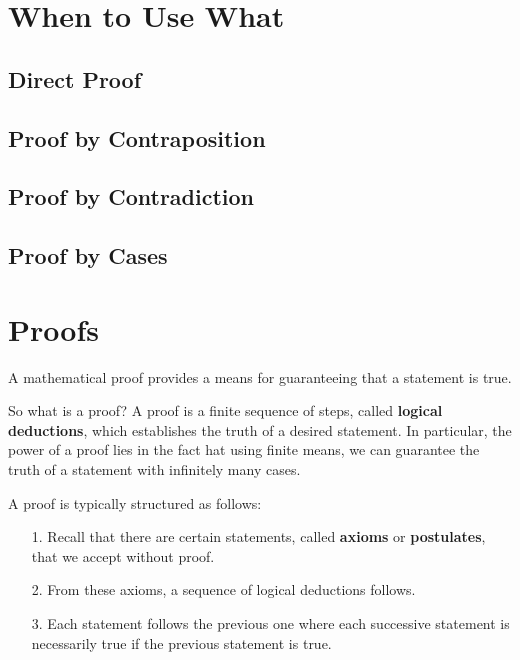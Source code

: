 \documentclass[12pt,a4paper]{article}
\begin{document}
\newpage

\section*{When to Use What}

\subsection*{Direct Proof}

\subsection*{Proof by Contraposition}

\subsection*{Proof by Contradiction}

\subsection*{Proof by Cases}

\newpage

\section*{Proofs}

A mathematical proof provides a means for guaranteeing that a statement is true. 

\bigbreak

So what is a proof? A proof is a finite sequence of steps, called \textbf{logical deductions}, which establishes the truth of a desired statement. In particular, the power of a proof lies in the fact hat using finite means, we can guarantee the truth of a statement with infinitely many cases.

\bigbreak

A proof is typically structured as follows:
\begin{itemize}
	\item[1.] Recall that there are certain statements, called \textbf{axioms} or \textbf{postulates}, that we accept without proof.
	\item[2.] From these axioms, a sequence of logical deductions follows.
	\item[3.] Each statement follows the previous one where each successive statement is necessarily true if the previous statement is true.
\end{itemize}
\end{document}
